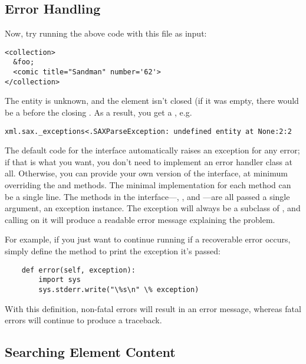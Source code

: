 \documentclass{howto}
\newcommand{\element}[1]{\code{#1}}
\begin{document}
\subsection{Error Handling}

Now, try running the above code with this file as input:
\begin{verbatim}
<collection>
  &foo;
  <comic title="Sandman" number='62'>
</collection>
\end{verbatim}

The  entity is unknown, and the \element{comic} element
isn't closed (if it was empty, there would be a \samp{/} before the
closing \samp{>}. As a result, you get a
, e.g.

\begin{verbatim}
xml.sax._exceptions<.SAXParseException: undefined entity at None:2:2
\end{verbatim}

The default code for the  interface automatically
raises an exception for any error; if that is what you want, you don't
need to implement an error handler class at all.  Otherwise, you can
provide your own version of the  interface, at
minimum overriding the  and 
methods.  The minimal implementation for each method can be a single
line.  The methods in the 
interface---, , and
---are all passed a single argument, an exception
instance.  The exception will always be a subclass of
, and calling  on it will produce
a readable error message explaining the problem.

For example, if you just want to continue running if a recoverable
error occurs, simply define the  method to print the
exception it's passed:

\begin{verbatim}
    def error(self, exception):
        import sys
        sys.stderr.write("\%s\n" \% exception)
\end{verbatim}

With this definition, non-fatal errors will result in an error message,
whereas fatal errors will continue to produce a traceback.

\subsection{Searching Element Content}
\end{document}
